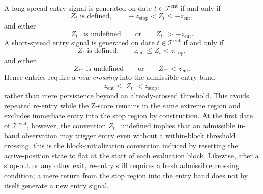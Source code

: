 \documentclass[11pt,a4paper]{article}
\begin{document}
A long-spread entry signal is generated on date \(t \in \mathcal T^{\mathrm{ent}}\)
if and only if
\[
  Z_t \text{ is defined},
  \qquad
  -z_{\mathrm{stop}} < Z_t \le -z_{\mathrm{ent}},
\]
and either
\[
  Z_{t^-} \text{ is undefined}
  \qquad\text{or}\qquad
  Z_{t^-} > -z_{\mathrm{ent}}.
\]
A short-spread entry signal is generated on date
\(t \in \mathcal T^{\mathrm{ent}}\) if and only if
\[
  Z_t \text{ is defined},
  \qquad
  z_{\mathrm{ent}} \le Z_t < z_{\mathrm{stop}},
\]
and either
\[
  Z_{t^-} \text{ is undefined}
  \qquad\text{or}\qquad
  Z_{t^-} < z_{\mathrm{ent}}.
\]
Hence entries require a \emph{new crossing} into the admissible entry band
\[
  z_{\mathrm{ent}} \le |Z_t| < z_{\mathrm{stop}},
\]
rather than mere persistence beyond an already-crossed threshold. This avoids
repeated re-entry while the Z-score remains in the same extreme region and
excludes immediate entry into the stop region by construction. At the first
date of \(\mathcal T^{\mathrm{eval}}\), however, the convention
\(Z_{t^-}\) undefined implies that an admissible in-band observation may
trigger entry even without a within-block threshold crossing; this is the
block-initialization convention induced by resetting the active-position state
to flat at the start of each evaluation block. Likewise, after a stop-out or
any other exit, re-entry still requires a fresh admissible crossing condition;
a mere return from the stop region into the entry band does not by itself
generate a new entry signal.
\end{document}
